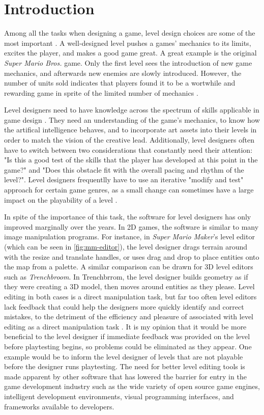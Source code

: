 \chapter{Introduction}

Among all the tasks when designing a game, level design choices are some of the
most important \cite{blezinski2000, smith2008}. A well-designed level pushes a games' mechanics to its limits,
excites the player, and makes a good game great. A great example is the original
\emph{Super Mario Bros.} game. Only the first level sees the introduction of new
game mechanics, and afterwards new enemies are slowly introduced. However, the
number of units sold indicates that players found it to be a wortwhile and
rewarding game in sprite of the limited number of mechanics \cite{shaker2011}.

Level designers need to have knowledge across the spectrum of skills applicable
in game design \cite{blezinski2000}. They need an understanding of the game's mechanics, to know how
the artifical intelligence behaves, and to incorporate art assets into their 
levels in order to match the vision of the creative lead. Additionally, level
designers often have to switch between two considerations that constantly need
their attention: "Is this a good test of the skills that the player has
developed at this point in the game?" and "Does this obstacle fit with the
overall pacing and rhythm of the level?". Level designers frequentlly have to
use an iterative "modify and test" approach for certain game genres, as a small
change can sometimes have a large impact on the playability of a level \cite{smith2010}.

In spite of the importance of this task, the software for level designers has only
improved marginally over the years. In 2D games, the software is similar to many image
manipulation programs. For instance, in \emph{Super Mario Maker}'s level editor (which
can be seen in \autoref{fig:mm-editor}), the level designer drags terrain around with the resize and
translate handles, or uses drag and drop to place entities onto the map from a palette.
A similar comparison can be drawn for 3D level editors such as \emph{Trenchbroom}. In
Trenchbrrom, the level designer builds geometry as if they were creating a 3D model, then
moves around entities as they please. Level editing in both cases is a direct manipulation
task, but far too often level editors lack feedback that could help the designers more
quickly identify and correct mistakes, to the detriment of the efficiency and pleasure of
associated with level editing as a direct manipulation task \cite{schneiderman1983}. It is my
opinion that it would be more beneficial to the level designer if immediate feedback was 
provided on the level before playtesting begins, so problems could be eliminated as they
appear. One example would be to inform the level designer of levels that are not playable
before the designer runs playtesting. The need for better level editing tools is made
apparent by other software that has lowered the barrier for entry in the game development
industry such as the wide variety of open source game engines, intelligent development
environments, visual programming interfaces, and frameworks available to developers.

